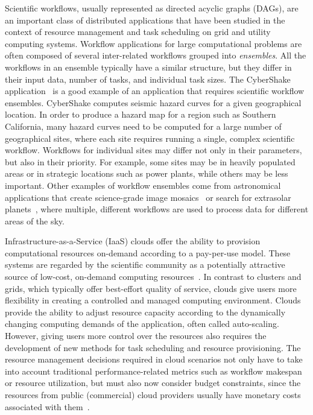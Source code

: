 \documentclass[conference]{IEEEtran}
\begin{document}
Scientific workflows, usually represented as directed acyclic graphs (DAGs), are
an important class of distributed applications that have been studied in the context of
resource management and task scheduling on grid and utility computing systems.
Workflow applications for large computational problems are often composed of 
several inter-related workflows grouped into {\em ensembles}. All the
workflows in an ensemble typically have a similar structure, but they differ in their
input data, number of tasks, and individual task sizes. The CyberShake 
application~\cite{Callaghan2011} is a good example of an application that requires 
scientific workflow ensembles. CyberShake computes seismic hazard curves for a given
geographical location. In order to produce a hazard map for a region such as 
Southern California, many hazard curves need to be computed for a large number of 
geographical sites, where each site requires running a single, complex scientific 
workflow. Workflows for individual sites may differ not only in their parameters, 
but also in their priority. For example, some sites may be in heavily populated areas 
or in strategic locations such as power plants, while others may be less important. 
Other examples of workflow ensembles come from astronomical applications that create
science-grade image mosaics~\cite{Deelman2008} or search for extrasolar 
planets~\cite{Vockler2011}, where multiple, different workflows are used to
process data for different areas of the sky.

Infrastructure-as-a-Service (IaaS) clouds offer the ability to provision 
computational resources on-demand according to a pay-per-use model. These systems 
are regarded by the scientific community as a potentially attractive source of 
low-cost, on-demand computing resources~\cite{Ostermann2010, Keahey2009}. In contrast 
to clusters and grids, which typically offer best-effort quality of service, clouds 
give users more flexibility in creating a controlled and managed computing environment.
Clouds provide the ability to adjust resource capacity according to the dynamically changing
computing demands of the application, often called auto-scaling. However, giving users 
more control over the resources also requires the development of new methods for task 
scheduling and resource provisioning. The resource management decisions required 
in cloud scenarios not only have to take into account traditional performance-related 
metrics such as workflow makespan or resource utilization, but must also now consider
budget constraints, since the resources from public (commercial) cloud providers 
usually have monetary costs associated with them~\cite{Durkee2010}.
\end{document}
